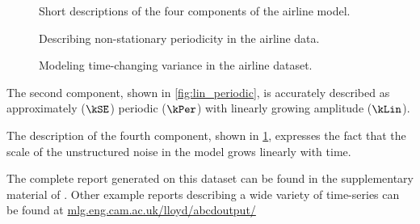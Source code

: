 \begin{figure}[ht!]
\centering
{}
\caption[Short descriptions of the four components of the airline model]
{Short descriptions of the four components of the airline model.}
\label{fig:exec-airline}
%
\centering
{}
\caption[Describing non-stationary periodicity in the airline data]
{Describing non-stationary periodicity in the airline data.}
\label{fig:lin_periodic}
%
\centering
{}
\caption[Modeling time-changing variance in the airline dataset]
{Modeling time-changing variance in the airline dataset.}
\label{fig:heteroscedastic}
\end{figure}

The second component, shown in \cref{fig:lin_periodic}, is accurately described as approximately ($\kSE$) periodic ($\kPer$) with linearly growing amplitude ($\kLin$).

The description of the fourth component, shown in \cref{fig:heteroscedastic}, expresses the fact that the scale of the unstructured noise in the model grows linearly with time.



The complete report generated on this dataset can be found in the supplementary material of \citet{LloDuvGroetal14}.
Other example reports describing a wide variety of time-series can be found at \url{mlg.eng.cam.ac.uk/lloyd/abcdoutput/}


